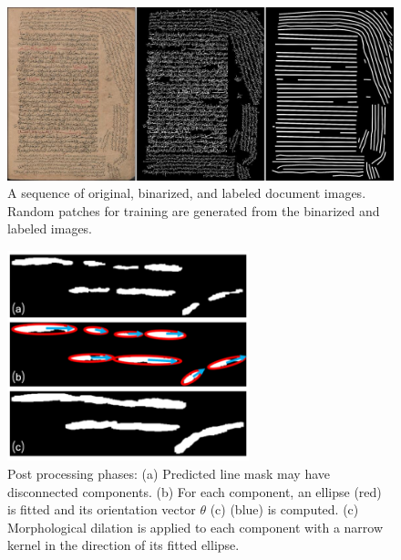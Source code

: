 \begin{figure}[!htb]
    \centering
    \includegraphics[width=12cm]{images/fcn_image.jpg}
    \caption{A sequence of original, binarized, and labeled document images. Random patches for training are generated from the binarized and labeled images.}
    \label{fig:fcn_image}
\end{figure}
\begin{figure}[!htb]
    \centering
    \includegraphics[width=7cm]{images/FCN_post.png}
    \caption{Post processing phases: (a) Predicted line mask may have disconnected components. (b) For each component, an ellipse (red) is fitted and its orientation vector $\theta$ (c) (blue) is computed. (c) Morphological dilation is applied to each component with a narrow kernel in the direction of its fitted ellipse.}
    \label{fig:fcn_post}
\end{figure}

